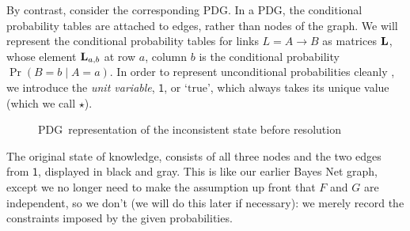 \documentclass{article}
\newcommand{\MN}{PDG}%
\begin{document}
\begin{example}
		By contrast, consider the corresponding \MN.
		In a \MN, the conditional probability tables are attached to edges, rather than nodes of the graph. 
		We will represent the conditional probability tables for links $L = A\to B$ as matrices $\mathbf L$, whose element $\mathbf L_{a,b}$ at row $a$, column $b$ is the conditional probability $\Pr(B = b \mid A = a)$. 		
		In order to represent unconditional probabilities cleanly%
		, we introduce the \emph{unit variable}, $\mathsf 1$, or `$\mathrm{true}$', which always takes its unique value (which we call $\star$). 
		
		\begin{figure}[h]
			\centering

			\caption{\MN\ representation of the inconsistent state before resolution}
			\label{fig:gun-floomp-diagram}
		\end{figure}
		
		The original state of knowledge, consists of all three nodes and the two edges from $\mathsf 1$, displayed in black and gray. This is like our earlier Bayes Net graph, except we no longer need to make the assumption up front that $F$ and $G$ are independent, so we don't (we will do this later if necessary): we merely record the constraints imposed by the given probabilities.
		

\end{example}
\end{document}
